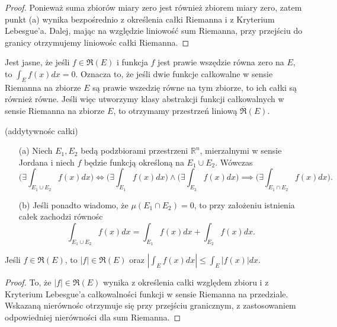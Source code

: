 \documentclass[leqno]{article}
\begin{document}
\begin{justify}
\begin{proof}
    Ponieważ suma zbiorów miary zero jest również zbiorem miary zero, zatem punkt (a) wynika bezpośrednio z określenia całki Riemanna i z Kryterium Lebesgue'a.
    Dalej, mając na względzie liniowość sum Riemanna, przy przejściu do granicy otrzymujemy liniowośc całki Riemanna.
\end{proof}

\begin{uwaga}
    Jest jasne, że jeśli $f \in \mathfrak{R}(E)$ i funkcja $f$ jest prawie wszędzie równa zero na $E$, to $\int_{E}f(x)dx = 0$. Oznacza to, że 
    jeśli dwie funkcje całkowalne w sensie Riemanna na zbiorze $E$ są prawie wszedzię równe na tym zbiorze, to ich całki są również równe.
    Jeśli więc utworzymy klasy abstrakcji funkcji całkowalnych w sensie Riemanna na zbiorze $E$, to otrzymamy przestrzeń liniową $\overline{\mathfrak{R}}(E)$.
\end{uwaga}

\begin{theorem}
{
    (addytywnośc całki) 
    \begin{itemize}
        \item [(a)]
            Niech $E_1, E_2$ bedą podzbiorami przestrzeni $\mathbb{R}^n$, mierzalnymi w sensie Jordana i niech $f$ będzie funkcją określoną na $E_1 \cup E_2$. Wówczas 
            \[
                \Big(\exists \int_{E_1 \cup E_2}f(x)dx\Big) \iff \Big(\exists \int_{E_1}f(x)dx\Big) \land \Big(\exists \int_{E_2}f(x)dx\Big) \implies \Big(\exists \int_{E_1 \cap E_2}f(x)dx\Big).
            \]
        \item [(b)]
            Jeśli ponadto wiadomo, że $\mu(E_1 \cap E_2) = 0$, to przy założeniu istnienia całek zachodzi równośc 
            \[
                \int_{E_1 \cup E_2}f(x)dx = \int_{E_1}f(x)dx + \int_{E_2}f(x)dx.
            \]  
    \end{itemize}
}
\end{theorem}

\begin{theorem}
{
    Jeśli $f \in \mathfrak{R}(E)$, to $|f| \in \mathfrak{R}(E)$ oraz $|\int_{E}f(x)dx| \leqslant \int_{E}|f(x)|dx$.
}
\end{theorem}

\begin{proof}
    To, że $|f| \in \mathfrak{R}(E)$ wynika z określenia całki względem zbioru i z Kryterium Lebesgue'a całkowalności funkcji w sensie Riemanna na przedziale.
    Wskazaną nierównośc otrzymuje się przy przejściu granicznym, z zastosowaniem odpowiedniej nierówności dla sum Riemanna.
\end{proof}


\end{justify}
\end{document}
